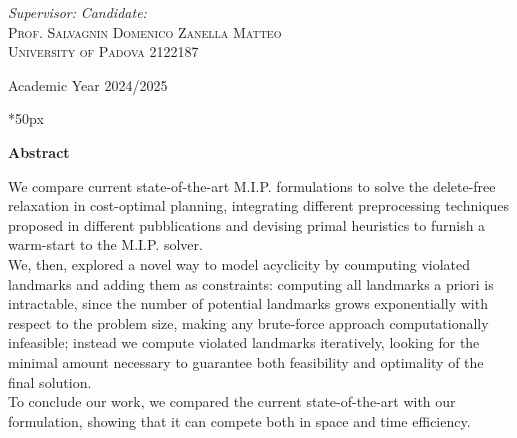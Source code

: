\documentclass[a4paper,twoside,12pt]{report}
\begin{document}
\begin{titlepage}
\begin{center}
\vfill

\textit{\large Supervisor:} \hfill \textit{\large Candidate:}\\
\textsc{\large Prof. Salvagnin Domenico} \hfill \textsc{Zanella Matteo}\\
\textsc{University of Padova} \hfill \textsc{2122187}\\

\vfill

Academic Year 2024/2025

\vfill


\end{center}
\end{titlepage}

\thispagestyle{empty}
\clearpage{\pagestyle{plain}\cleardoublepage}
    
\clearpage\null\newpage

\newcommand\summaryname{Abstract}
\newenvironment{Abstract} {
    \begin{center}%
    \bfseries{\summaryname} \end{center}
}

\vspace*{50px}

\begin{Abstract}
    \begin{center}
        We compare current state-of-the-art M.I.P. formulations to solve the delete-free relaxation in cost-optimal planning, integrating different preprocessing techniques proposed in different pubblications and devising primal heuristics to furnish a warm-start to the M.I.P. solver.\\
        We, then, explored a novel way to model acyclicity by coumputing violated landmarks and adding them as constraints: computing all landmarks a priori is intractable, since the number of potential landmarks grows exponentially with respect to the problem size, making any brute-force approach computationally infeasible; instead we compute violated landmarks iteratively, looking for the minimal amount necessary to guarantee both feasibility and optimality of the final solution.\\
        To conclude our work, we compared the current state-of-the-art with our formulation, showing that it can compete both in space and time efficiency.
    \end{center}
\end{Abstract}
\end{document}
